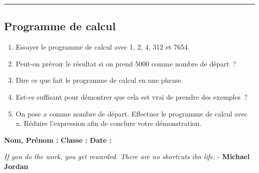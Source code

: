 \documentclass[11pt]{article}
\newcommand{\horrule}[1]{\rule{\linewidth}{#1}} %
\begin{document}
\vspace{-0.4cm}
\horrule{1px}
\vspace{-0.8cm}

\subsection*{Programme de calcul}

\begin{enumerate}
  \item Essayer le programme de calcul avec 1, 2, 4, 312 et 7654.
  \item Peut-on prévoir le résultat si on prend 5000 comme nombre de départ ?
  \item Dire ce que fait le programme de calcul en une phrase.
  \item Est-ce suffisant pour démontrer que cela est vrai de prendre des exemples ?
  \item On pose $x$ comme nombre de départ. Effectuer le programme de calcul avec x. Réduire l’expression afin de conclure votre démonstration.
\end{enumerate}

\newpage

\textbf{Nom, Prénom :} \hspace{8cm} \textbf{Classe :} \hspace{3cm} \textbf{Date :}\\
\vspace{-0.8cm}
\begin{center}
  \textit{If you do the work, you get rewarded. There are no shortcuts ibn life.}  - \textbf{Michael Jordan}
\end{center}
\vspace{-0.8cm}
\end{document}
